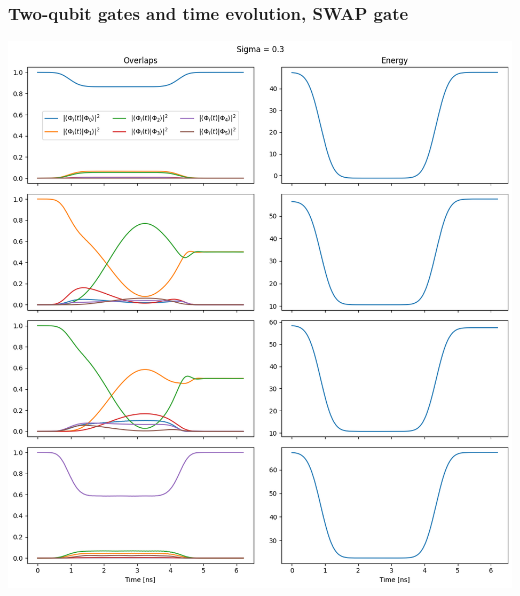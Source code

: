 \documentclass{beamer}
\begin{document}
\begin{frame}
\frametitle{Two-qubit gates and time evolution, SWAP gate}
\centerline{\includegraphics[width=0.65\linewidth]{qcfigures/timeevolution.png}}
\end{frame}
\end{document}
